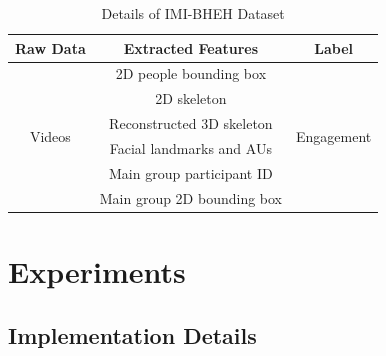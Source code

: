 \documentclass[10pt,journal,compsoc]{IEEEtran}
\begin{document}
\begin{table}[t]
  \renewcommand{\arraystretch}{1.3}
  \centering
  \caption{Details of IMI-BHEH Dataset}
  \label{t:dataset}
  \begin{tabular}{ccc}
  \toprule
  \textbf{Raw Data} &
  \textbf{Extracted Features} &
  \textbf{Label}\\
  \midrule
  \multirow{6}{*}{Videos} & 2D people bounding box & \multirow{6}{*}{Engagement} \\
  & 2D skeleton & \\
  & Reconstructed 3D skeleton & \\
  & Facial landmarks and AUs & \\
  & Main group participant ID & \\
  & Main group 2D bounding box & \\
  \bottomrule
  \end{tabular}
\end{table}

\section{Experiments}
\label{s:Experiments}

\subsection{Implementation Details}
\label{subs:Implementation_Details}
\end{document}
